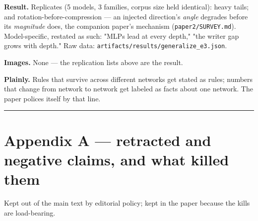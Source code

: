 \documentclass[10pt]{article}
\begin{document}
\textbf{Result.} Replicates (5 models, 3 families, corpus size held identical): heavy tails; and rotation-before-compression --- an injected direction's \emph{angle} degrades before its
\emph{magnitude} does, the companion paper's mechanism (\texttt{paper2/SURVEY.md}). Model-specific, restated as such: "MLPs lead at every depth," "the
writer gap grows with depth." Raw data: \texttt{artifacts/results/generalize\_e3.json}.

\textbf{Images.} None --- the replication lists above are the result.

\textbf{Plainly.} Rules that survive across different networks get stated as rules; numbers that change
from network to network get labeled as facts about one network. The paper polices itself by that
line.

\bigskip\hrule\bigskip

\section{Appendix A --- retracted and negative claims, and what killed them}

Kept out of the main text by editorial policy; kept in the paper because the kills are load-bearing.
\end{document}

